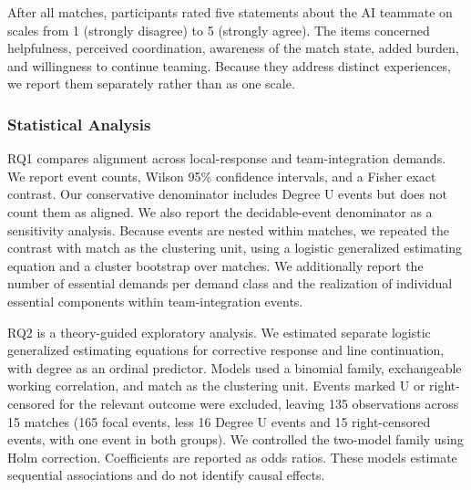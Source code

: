 \documentclass[manuscript,review,anonymous]{acmart}
\begin{document}
After all matches, participants rated five statements about the AI teammate on scales from 1 (strongly disagree) to 5 (strongly agree). The items concerned helpfulness, perceived coordination, awareness of the match state, added burden, and willingness to continue teaming. Because they address distinct experiences, we report them separately rather than as one scale.

\subsubsection{Statistical Analysis}

RQ1 compares alignment across local-response and team-integration demands. We report event counts, Wilson 95\% confidence intervals, and a Fisher exact contrast. Our conservative denominator includes Degree U events but does not count them as aligned. We also report the decidable-event denominator as a sensitivity analysis. Because events are nested within matches, we repeated the contrast with match as the clustering unit, using a logistic generalized estimating equation and a cluster bootstrap over matches. We additionally report the number of essential demands per demand class and the realization of individual essential components within team-integration events.

RQ2 is a theory-guided exploratory analysis. We estimated separate logistic generalized estimating equations for corrective response and line continuation, with degree as an ordinal predictor. Models used a binomial family, exchangeable working correlation, and match as the clustering unit. Events marked U or right-censored for the relevant outcome were excluded, leaving 135 observations across 15 matches (165 focal events, less 16 Degree U events and 15 right-censored events, with one event in both groups). We controlled the two-model family using Holm correction. Coefficients are reported as odds ratios. These models estimate sequential associations and do not identify causal effects.
\end{document}
